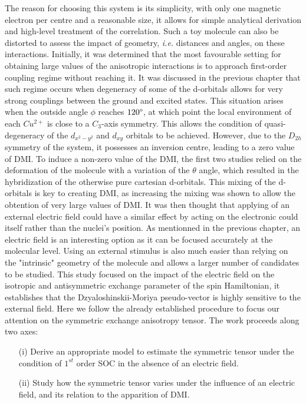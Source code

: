 \documentclass[12pt]{report}
\numberwithin{equation}{section}
\begin{document}
The reason for choosing this system is its simplicity, with only one magnetic electron per centre and a reasonable size, it allows for simple analytical derivation and high-level treatment of the correlation.
Such a toy molecule can also be distorted to assess the impact of geometry, \textit{i.e.} distances and angles, on these interactions.
Initially, it was determined that the most favourable setting for obtaining large values of the anisotropic interactions is to approach first-order coupling regime without reaching it.
It was discussed in the previous chapter that such regime occurs when degeneracy of some of the d-orbitals allows for very strong couplings between the ground and excited states.
This situation arises when the outside angle $\phi$ reaches $120 \degree$, at which point the local environment of each $Cu^{2+}$ is close to a $C_3$-axis symmetry.
This allows the condition of quasi-degeneracy of the $d_{x^2-y^2}$ and $d_{xy}$ orbitals to be achieved. However, due to the $D_{2h}$ symmetry of the system, it possesses an inversion centre, leading to a zero value of DMI.
To induce a non-zero value of the DMI, the first two studies relied on the deformation of the molecule with a variation of the $\theta$ angle, which resulted in the hybridization of the otherwise pure cartesian d-orbitals.
This mixing of the d-orbitals is key to creating DMI, as increasing the mixing was shown to allow the obtention of very large values of DMI.
It was then thought that applying of an external electric field could have a similar effect by acting on the electronic could itself rather than the nuclei's position.
As mentionned in the previous chapter, an electric field is an interesting option as it can be focused accurately at the molecular level. 
Using an external stimulus is also much easier than relying on the "intrinsic" geometry of the molecule and allows a larger number of candidates to be studied.
This study focused on the impact of the electric field on the isotropic and antisymmetric exchange parameter of the spin Hamiltonian, it establishes that the Dzyaloshinskii-Moriya pseudo-vector is highly sensitive to the external field.
Here we follow the already established procedure to focus our attention on the symmetric exchange anisotropy tensor.
The work proceeds along two axes:
\begin{itemize}
    \item[(i)] Derive an appropriate model to estimate the symmetric tensor under the condition of $1^{st}$ order SOC in the absence of an electric field.
    \item[(ii)] Study how the symmetric tensor varies under the influence of an electric field, and its relation to the apparition of DMI.
\end{itemize}
\end{document}
